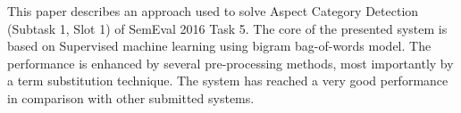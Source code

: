 This paper describes an approach used to solve Aspect Category Detection (Subtask 1, Slot 1) of SemEval 2016 Task 5. The core of the presented system is based on Supervised machine learning using bigram bag-of-words model. The performance is enhanced by several pre-processing methods, most importantly by a term substitution technique. The system has reached a very good performance in comparison with other submitted systems.
